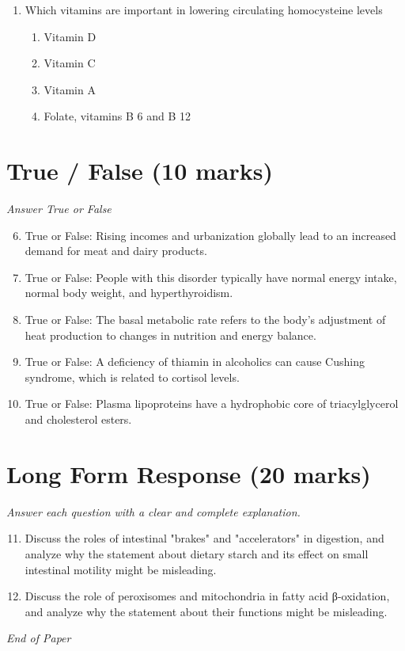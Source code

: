 \documentclass[12pt]{article}
\begin{document}
\begin{enumerate}[label=\arabic*.]
\begin{enumerate}[label=(\alph*)]
    \item Alpha limit dextrins
    \item Sucrose
    \item polysaccharides
\end{enumerate}
\item Which vitamins are important in lowering circulating homocysteine levels
\begin{enumerate}[label=(\alph*)]
    \item Vitamin D
    \item Vitamin C
    \item Vitamin A
    \item Folate, vitamins B 6 and B 12
\end{enumerate}
\end{enumerate}

\section*{True / False (10 marks)}
\textit{Answer True or False}
\begin{enumerate}[label=\arabic*.]
\setcounter{enumi}{5}
\item True or False: Rising incomes and urbanization globally lead to an increased demand for meat and dairy products.
\item True or False: People with this disorder typically have normal energy intake, normal body weight, and hyperthyroidism.
\item True or False: The basal metabolic rate refers to the body's adjustment of heat production to changes in nutrition and energy balance.
\item True or False: A deficiency of thiamin in alcoholics can cause Cushing syndrome, which is related to cortisol levels.
\item True or False: Plasma lipoproteins have a hydrophobic core of triacylglycerol and cholesterol esters.
\end{enumerate}

\section*{Long Form Response (20 marks)}
\textit{Answer each question with a clear and complete explanation.}
\begin{enumerate}[label=\arabic*.]
\setcounter{enumi}{10}
\item Discuss the roles of intestinal "brakes" and "accelerators" in digestion, and analyze why the statement about dietary starch and its effect on small intestinal motility might be misleading.
\item Discuss the role of peroxisomes and mitochondria in fatty acid β-oxidation, and analyze why the statement about their functions might be misleading.
\end{enumerate}

\vfill
\noindent\textit{End of Paper}
\end{document}
